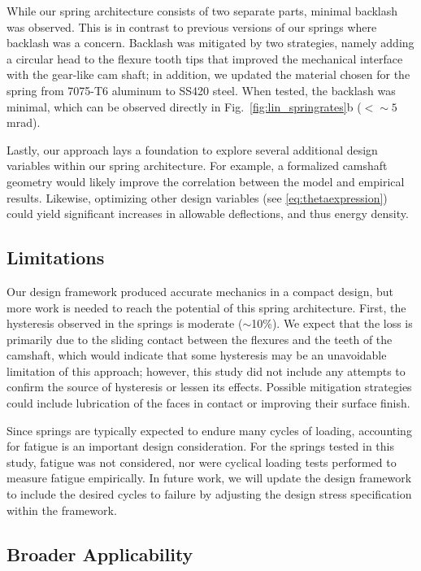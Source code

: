 \documentclass[letterpaper, 10 pt, conference]{ieeeconf} %
\begin{document}
    While our spring architecture consists of two separate parts, minimal backlash was observed. This is in contrast to previous versions of our springs where backlash was a concern. Backlash was mitigated by two strategies, namely adding a circular head to the flexure tooth tips that improved the mechanical interface with the gear-like cam shaft; in addition, we updated the material chosen for the spring from 7075-T6 aluminum to SS420 steel. When tested, the backlash was minimal, which can be observed directly in Fig.~\ref{fig:lin_springrates}b ($<\sim5$ mrad). 
    
    Lastly, our approach lays a foundation to explore several additional design variables within our spring architecture. For example, a formalized camshaft geometry would likely improve the correlation between the model and empirical results. Likewise, optimizing other design variables (see \eqref{eq:thetaexpression}) could yield significant increases in allowable deflections, and thus energy density.

\subsection{Limitations}
    Our design framework produced accurate mechanics in a compact design, but more work is needed to reach the potential of this spring architecture. First, the hysteresis observed in the springs is moderate ($\sim$10\%). We expect that the loss is primarily due to the sliding contact between the flexures and the teeth of the camshaft, which would indicate that some hysteresis may be an unavoidable limitation of this approach; however, this study did not include any attempts to confirm the source of hysteresis or lessen its effects. Possible mitigation strategies could include lubrication of the faces in contact or improving their surface finish.
    
    Since springs are typically expected to endure many cycles of loading, accounting for fatigue is an important design consideration. For the springs tested in this study, fatigue was not considered, nor were cyclical loading tests performed to measure fatigue empirically. In future work, we will update the design framework to include the desired cycles to failure by adjusting the design stress specification within the framework.
    
\subsection{Broader Applicability}
\end{document}
